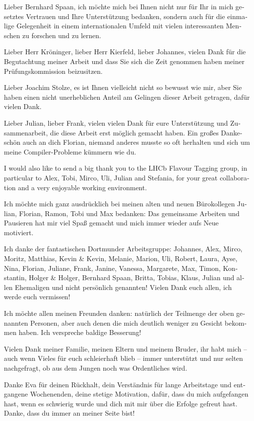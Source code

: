 
\cleardoublepage
\pagestyle{plain}

\begin{german}
  Lieber Bernhard Spaan, ich möchte mich bei Ihnen nicht nur für Ihr in mich gesetztes Vertrauen und Ihre Unterstützung bedanken, sondern auch für die einmalige Gelegenheit in einem internationalen Umfeld mit vielen interessanten Menschen zu forschen und zu lernen.

  Lieber Herr Kröninger, lieber Herr Kierfeld, lieber Johannes, vielen Dank für die Begutachtung meiner Arbeit und dass Sie sich die Zeit genommen haben meiner Prüfungskommission beizusitzen.

  Lieber Joachim Stolze, es ist Ihnen vielleicht nicht so bewusst wie mir, aber Sie haben einen nicht unerheblichen Anteil am Gelingen dieser Arbeit getragen, dafür vielen Dank.

  Lieber Julian, lieber Frank, vielen vielen Dank für eure Unterstützung und Zusammenarbeit, die diese Arbeit erst möglich gemacht haben. Ein großes Dankeschön auch an dich Florian, niemand anderes musste so oft herhalten und sich um meine Compiler-Probleme kümmern wie du. 

  I would also like to send a big thank you to the LHCb Flavour Tagging group, in particular to Alex, Tobi, Mirco, Uli, Julian and Stefania, for your great collaboration and a very enjoyable working environment. 

  Ich möchte mich ganz ausdrücklich bei meinen alten und neuen Bürokollegen Julian, Florian, Ramon, Tobi und Max bedanken: Das gemeinsame Arbeiten und Pausieren hat mir viel Spaß gemacht und mich immer wieder aufs Neue motiviert.

  Ich danke der fantastischen Dortmunder Arbeitsgruppe: Johannes, Alex, Mirco, Moritz, Matthias, Kevin \& Kevin, Melanie, Marion, Uli, Robert, Laura, Ayse, Nina, Florian, Juliane, Frank, Janine, Vanessa, Margarete, Max, Timon, Konstantin, Holger \& Holger, Bernhard Spaan, Britta, Tobias, Klaus, Julian und allen Ehemaligen und nicht persönlich genannten! Vielen Dank euch allen, ich werde euch vermissen! 

  Ich möchte allen meinen Freunden danken: natürlich der Teilmenge der oben genannten Personen, aber auch denen die mich deutlich weniger zu Gesicht bekommen haben. Ich verspreche baldige Besserung!

  Vielen Dank meiner Familie, meinen Eltern und meinem Bruder, ihr habt mich -- auch wenn Vieles für euch schleierhaft blieb -- immer unterstützt und nur selten nachgefragt, ob aus dem Jungen noch was Ordentliches wird.

  Danke Eva für deinen Rückhalt, dein Verständnis für lange Arbeitstage und entgangene Wochenenden, deine stetige Motivation, dafür, dass du mich aufgefangen hast, wenn es schwierig wurde und dich mit mir über die Erfolge gefreut hast. Danke, dass du immer an meiner Seite bist! 
\end{german}